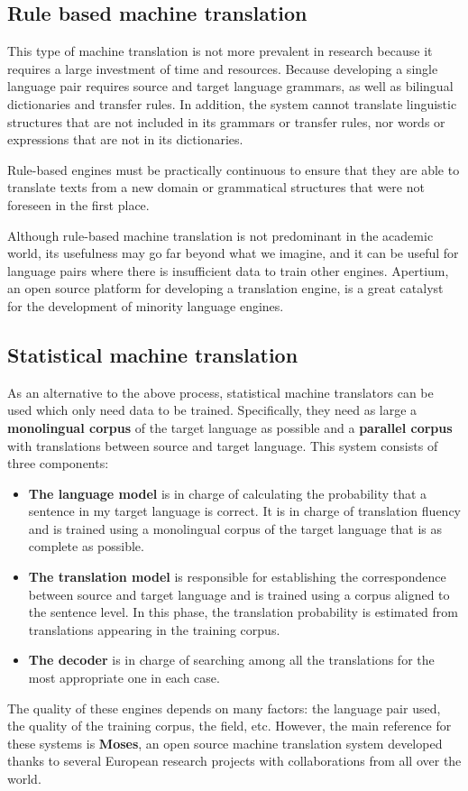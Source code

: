 \documentclass[a4paper]{article}
\theoremstyle{plain}
\theoremstyle{definition}
\begin{document}
    \subsection{Rule based machine translation}
    This type of machine translation is not more prevalent in research because it requires a large investment of time and resources. Because developing a single language pair requires source and target language grammars, as well as bilingual dictionaries and transfer rules. In addition, the system cannot translate linguistic structures that are not included in its grammars or transfer rules, nor words or expressions that are not in its dictionaries.\newline

    Rule-based engines must be practically continuous to ensure that they are able to translate texts from a new domain or grammatical structures that were not foreseen in the first place. \newline

    Although rule-based machine translation is not predominant in the academic world, its usefulness may go far beyond what we imagine, and it can be useful for language pairs where there is insufficient data to train other engines. Apertium, an open source platform for developing a translation engine, is a great catalyst for the development of minority language engines.
    
    \subsection{Statistical machine translation}
	As an alternative to the above process, statistical machine translators can be used which only need data to be trained. Specifically, they need as large a \textbf{monolingual corpus} of the target language as possible and a \textbf{parallel corpus} with translations between source and target language. This system consists of three components: 
    \begin{itemize}
        \item \textbf{The language model} is in charge of calculating the probability that a sentence in my target language is correct. It is in charge of translation fluency and is trained using a monolingual corpus of the target language that is as complete as possible.
         \item \textbf{The translation model} is responsible for establishing the correspondence between source and target language and is trained using a corpus aligned to the sentence level. In this phase, the translation probability is estimated from translations appearing in the training corpus.
         \item \textbf{The decoder} is in charge of searching among all the translations for the most appropriate one in each case.
    \end{itemize}
    The quality of these engines depends on many factors: the language pair used, the quality of the training corpus, the field, etc. However, the main reference for these systems is \textbf{Moses}, an open source machine translation system developed thanks to several European research projects with collaborations from all over the world.
    
\end{document}
